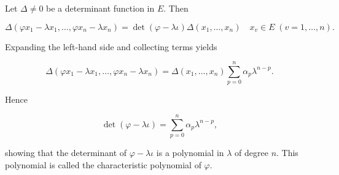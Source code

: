 Let $\Delta \neq 0$ be a determinant function in $E$. Then

$$\Delta(\varphi x_1 - \lambda x_1, \ldots, \varphi x_n - \lambda x_n) = \det(\varphi - \lambda \iota) \Delta(x_1, \ldots, x_n) \quad x_v \in E\;(v = 1, \ldots, n).$$

Expanding the left-hand side and collecting terms yields

$$\Delta(\varphi x_1 - \lambda x_1, \ldots, \varphi x_n - \lambda x_n) = \Delta(x_1, \ldots, x_n) \sum_{p=0}^{n} \alpha_p \lambda^{n-p}.$$

Hence

$$\det(\varphi - \lambda \iota) = \sum_{p=0}^{n} \alpha_p \lambda^{n-p},$$

showing that the determinant of $\varphi - \lambda \iota$ is a polynomial in $\lambda$ of degree $n$. This polynomial is called the characteristic polynomial of $\varphi$.
